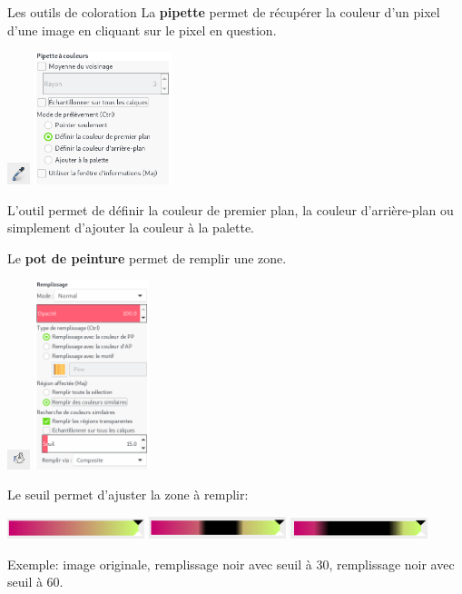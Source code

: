 \documentclass[10pt,svgnames,usenames,table]{beamer}
\begin{document}
\begin{frame}[allowframebreaks]{Les outils de coloration}
	La \textbf{pipette} permet de récupérer la couleur d'un pixel d'une image en cliquant sur le pixel en question.
	\begin{center}
		\includegraphics[width=0.05\textwidth]{Images/color_tool_0.png}
		\includegraphics[width=0.3\textwidth]{Images/color_tool_0_settings.png}
	\end{center}
	L'outil permet de définir la couleur de premier plan, la couleur d'arrière-plan ou simplement d'ajouter la couleur à la palette.
	
	\framebreak
	Le \textbf{pot de peinture} permet de remplir une zone.
	\begin{center}
		\includegraphics[width=0.05\textwidth]{Images/color_tool_1.png}
		\includegraphics[width=0.25\textwidth]{Images/color_tool_1_settings.png}
	\end{center}
	Le seuil permet d'ajuster la zone à remplir: 
	\begin{center}
		\includegraphics[width=0.3\textwidth]{Images/color_tool_1_test0.png}
		\includegraphics[width=0.3\textwidth]{Images/color_tool_1_test1.png}
		\includegraphics[width=0.3\textwidth]{Images/color_tool_1_test2.png}
	\end{center}
	\begin{scriptsize}
	Exemple: image originale, remplissage noir avec seuil à 30, remplissage noir avec seuil à 60.
	\end{scriptsize}
	

\end{frame}
\end{document}
